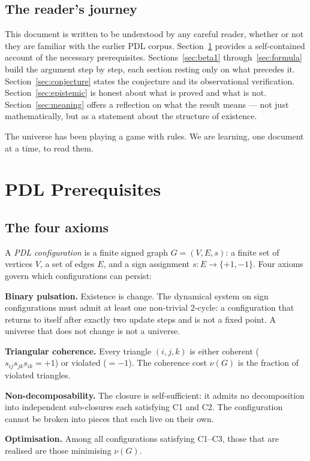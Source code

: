 \documentclass[12pt,a4paper]{article}
\begin{document}
\subsection{The reader's journey}

This document is written to be understood by any careful reader, whether or not they are familiar with the earlier PDL corpus. Section~\ref{sec:prereq} provides a self-contained account of the necessary prerequisites. Sections~\ref{sec:beta1} through~\ref{sec:formula} build the argument step by step, each section resting only on what precedes it. Section~\ref{sec:conjecture} states the conjecture and its observational verification. Section~\ref{sec:epistemic} is honest about what is proved and what is not. Section~\ref{sec:meaning} offers a reflection on what the result means — not just mathematically, but as a statement about the structure of existence.

The universe has been playing a game with rules. We are learning, one document at a time, to read them.

\section{PDL Prerequisites}
\label{sec:prereq}

\subsection{The four axioms}

A \emph{PDL configuration} is a finite signed graph $G = (V, E, s)$: a finite set of vertices $V$, a set of edges $E$, and a sign assignment $s: E \to \{+1, -1\}$. Four axioms govern which configurations can persist:

\begin{description}[leftmargin=2em, labelwidth=1.5em]
\item[C1] \textbf{Binary pulsation.} Existence is change. The dynamical system on sign configurations must admit at least one non-trivial 2-cycle: a configuration that returns to itself after exactly two update steps and is not a fixed point. A universe that does not change is not a universe.
\item[C2] \textbf{Triangular coherence.} Every triangle $(i,j,k)$ is either coherent ($s_{ij}s_{jk}s_{ik} = +1$) or violated ($= -1$). The coherence cost $\nu(G)$ is the fraction of violated triangles.
\item[C3] \textbf{Non-decomposability.} The closure is self-sufficient: it admits no decomposition into independent sub-closures each satisfying C1 and C2. The configuration cannot be broken into pieces that each live on their own.
\item[C4] \textbf{Optimisation.} Among all configurations satisfying C1--C3, those that are realised are those minimising $\nu(G)$.
\end{description}
\end{document}
